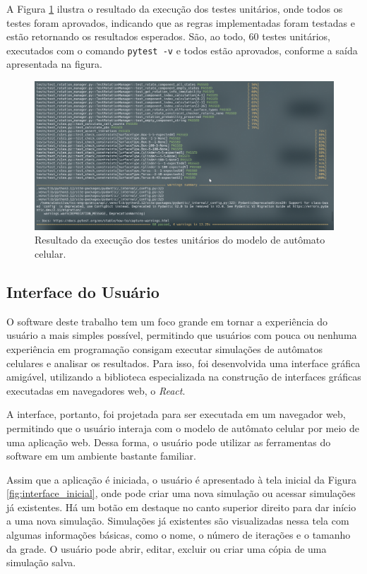 \documentclass[12pt,oneside]{report}
\begin{document}
A Figura \ref{fig:unit_tests} ilustra o resultado da execução dos testes unitários, onde todos os testes foram aprovados, indicando que as regras implementadas foram testadas e estão retornando os resultados esperados. São, ao todo, 60 testes unitários, executados com o comando \texttt{pytest -v} e todos estão aprovados, conforme a saída apresentada na figura.

\begin{figure}[H]
    \centering
    \includegraphics[width=1\textwidth]{img/unit_test.png}
    \caption{\small Resultado da execução dos testes unitários do modelo de autômato celular.}
    \label{fig:unit_tests}
\end{figure}

\subsection{Interface do Usuário}

O software deste trabalho tem um foco grande em tornar a experiência do usuário a mais simples possível, permitindo que usuários com pouca ou nenhuma experiência em programação consigam executar simulações de autômatos celulares e analisar os resultados. Para isso, foi desenvolvida uma interface gráfica amigável, utilizando a biblioteca especializada na construção de interfaces gráficas executadas em navegadores web, o \textit{React}.

A interface, portanto, foi projetada para ser executada em um navegador web, permitindo que o usuário interaja com o modelo de autômato celular por meio de uma aplicação web. Dessa forma, o usuário pode utilizar as ferramentas do software em um ambiente bastante familiar.

Assim que a aplicação é iniciada, o usuário é apresentado à tela inicial da Figura \ref{fig:interface_inicial}, onde pode criar uma nova simulação ou acessar simulações já existentes. Há um botão em destaque no canto superior direito para dar início a uma nova simulação. Simulações já existentes são visualizadas nessa tela com algumas informações básicas, como o nome, o número de iterações e o tamanho da grade. O usuário pode abrir, editar, excluir ou criar uma cópia de uma simulação salva.
\end{document}
